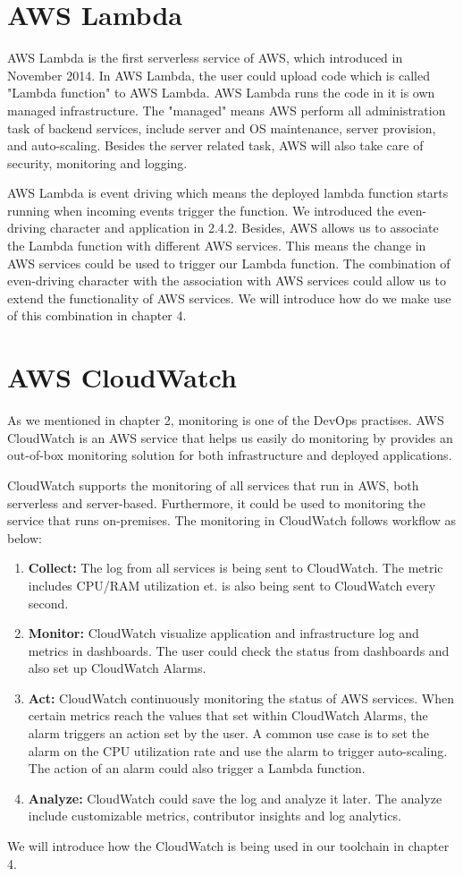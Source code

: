 \section{AWS Lambda}
AWS Lambda is the first serverless service of AWS,
which introduced in November 2014. In AWS Lambda, the user could upload code which is called "Lambda function" to AWS Lambda. AWS Lambda runs the code in it is own managed infrastructure. The "managed" means AWS perform all administration task of backend services, include server and OS maintenance, server provision, and auto-scaling. Besides the server related task, AWS will also take care of security, monitoring and logging.
\par
 AWS Lambda is event driving which means the deployed lambda function starts running when incoming events trigger the function. We introduced the even-driving character and application in 2.4.2. Besides, AWS allows us to associate the Lambda function with different AWS services. This means the change in AWS services could be used to trigger our Lambda function. The combination of even-driving character with the association with AWS services could allow us to extend the functionality of AWS services. We will introduce how do we make use of this combination in chapter 4.
\section{AWS CloudWatch}
As we mentioned in chapter 2, monitoring is one of the DevOps practises. AWS CloudWatch is an AWS service that helps us easily do monitoring by provides an out-of-box monitoring solution for both infrastructure and deployed applications. 
\par
CloudWatch supports the monitoring of all services that run in AWS, both serverless and server-based. Furthermore, it could be used to monitoring the service that runs on-premises. The monitoring in CloudWatch follows workflow as below:
\begin{enumerate}
    \item \textbf{Collect:} The log from all services is being sent to CloudWatch. The metric includes CPU/RAM utilization et. is also being sent to CloudWatch every second.
    \item \textbf{Monitor:} CloudWatch visualize application and infrastructure log and metrics in dashboards. The user could check the status from dashboards and also set up CloudWatch Alarms.
    \item \textbf{Act:} CloudWatch continuously monitoring the status of AWS services. 
    When certain metrics reach the values that set within CloudWatch Alarms, the alarm triggers an action set by the user. A common use case is to set the alarm on the CPU utilization rate and use the alarm to trigger auto-scaling. The action of an alarm could also trigger a Lambda function.
    \item \textbf{Analyze:} CloudWatch could save the log and analyze it later. The analyze include customizable metrics, contributor insights and log analytics.
\end{enumerate}
We will introduce how the CloudWatch is being used in our toolchain in chapter 4.
